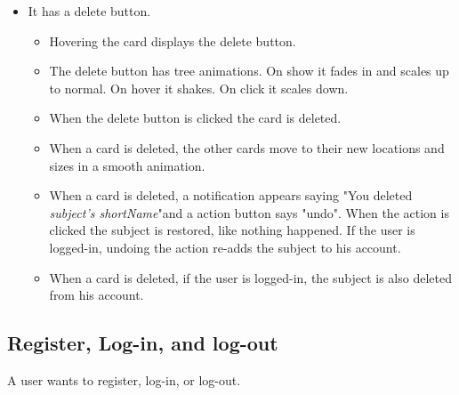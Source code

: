 \begin{itemize}[leftmargin=2cm]
\begin{itemize}[leftmargin=2cm]
    \end{itemize}
    \item[\nextTask{}\label{req:x}] It has a delete button.
    \begin{itemize}[leftmargin=2cm]
        \item[\nextTask{}\label{req:x}] Hovering the card displays the delete button.
        \item[\nextTask{}\label{req:x}] The delete button has tree animations. On show it fades in and scales up to normal. On hover it shakes. On click it scales down.
        \item[\nextTask{}\label{req:x}] When the delete button is clicked the card is deleted.
        \item[\nextTask{}\label{req:x}] When a card is deleted, the other cards move to their new locations and sizes in a smooth animation.
        \item[\nextTask{}\label{req:x}] When a card is deleted, a notification appears saying "You deleted \textit{subject's shortName}"\space and a action button says "undo". When the action is clicked the subject is restored, like nothing happened. If the user is logged-in, undoing the action re-adds the subject to his account.
        \item[\nextTask{}\label{req:x}] When a card is deleted, if the user is logged-in, the subject is also deleted from his account.
    \end{itemize}
\end{itemize}

\subsection*{Register, Log-in, and log-out}
A user wants to register, log-in, or log-out.

